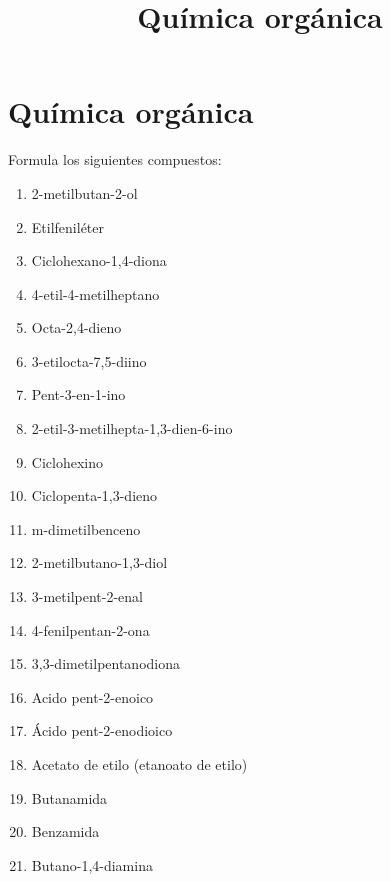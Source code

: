 \documentclass[
]{article}
\title{Química orgánica}
\author{}
\date{}
\providecommand{\tightlist}{%
  \setlength{\itemsep}{0pt}\setlength{\parskip}{0pt}}
\begin{document}
\maketitle

\hypertarget{quuxedmica-orguxe1nica}{%
\section{Química orgánica}\label{quuxedmica-orguxe1nica}}

\begin{exercise}[tags=OXF15] Formula los siguientes compuestos:

\begin{enumerate}
\def\labelenumi{\alph{enumi})}
\tightlist
\item
  2-metilbutan-2-ol
\item
  Etilfeniléter
\item
  Ciclohexano-1,4-diona
\item
  4-etil-4-metilheptano
\item
  Octa-2,4-dieno
\item
  3-etilocta-7,5-diino
\item
  Pent-3-en-1-ino
\item
  2-etil-3-metilhepta-1,3-dien-6-ino
\item
  Ciclohexino
\item
  Ciclopenta-1,3-dieno
\item
  m-dimetilbenceno
\item
  2-metilbutano-1,3-diol
\item
  3-metilpent-2-enal
\item
  4-fenilpentan-2-ona
\item
  3,3-dimetilpentanodiona
\item
  Acido pent-2-enoico
\item
  Ácido pent-2-enodioico
\item
  Acetato de etilo (etanoato de etilo)
\item
  Butanamida
\item
  Benzamida
\item
  Butano-1,4-diamina
\end{enumerate}

\end{exercise}
\end{document}
